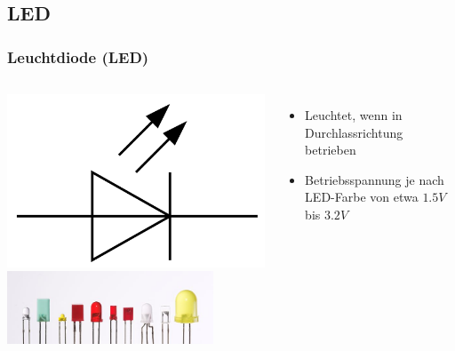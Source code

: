 \subsection*{LED}
\begin{frame}
    \frametitle{Leuchtdiode (LED)}
    \begin{columns}[c]
        \begin{center}
            \includegraphics[width=1\textwidth,height=.3\textheight,keepaspectratio]{a05/Symbol_LED.png}\\
            \includegraphics[width=0.8\textwidth,height=.55\textheight,keepaspectratio]{a05/Verschiedene_LEDs.jpg}
            \tiny \hyperlink{refs}{\cite{wm}}
        \end{center}
    \begin{itemize}
			\item Leuchtet, wenn in Durchlassrichtung betrieben
			\item Betriebsspannung je nach LED-Farbe von etwa $1.5V$ bis $3.2V$
    \end{itemize}
    \end{columns}
\end{frame}

